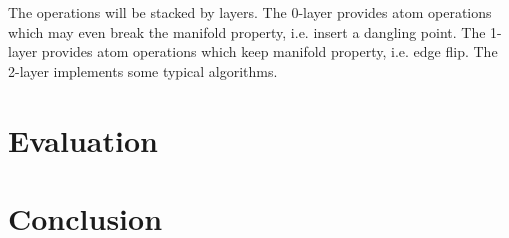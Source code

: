 \documentclass[9pt,twocolumn]{extarticle}
\begin{document}
The operations will be stacked by layers. The 0-layer provides atom
operations which may even break the manifold property, i.e. insert a
dangling point.  The 1-layer provides atom operations which keep
manifold property, i.e. edge flip. The 2-layer implements some typical
algorithms.

\section{Evaluation}

\section{Conclusion}
\end{document}

